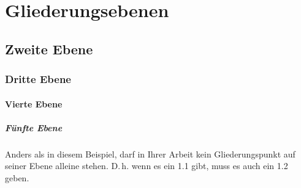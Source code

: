 \chapter{Gliederungsebenen}

\section{Zweite Ebene}

\subsection{Dritte Ebene}

\label{Gliederung:EbeneDrei}


\subsubsection{Vierte Ebene}

\paragraph{Fünfte Ebene} Anders als in diesem Beispiel, darf in Ihrer Arbeit kein Gliederungspunkt auf seiner Ebene alleine stehen. D.\,h. wenn es ein 1.1 gibt, muss es auch ein 1.2 geben.\citep{Kornmeier2011}
